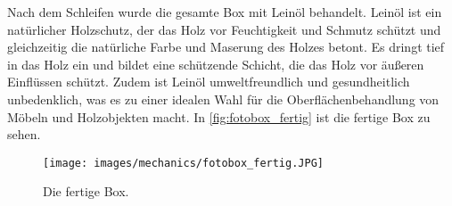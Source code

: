 Nach dem Schleifen wurde die gesamte Box mit Leinöl behandelt.
Leinöl ist ein natürlicher Holzschutz, der das Holz vor Feuchtigkeit
und Schmutz schützt und gleichzeitig die natürliche Farbe und Maserung des Holzes
betont. Es dringt tief in das Holz ein und bildet eine schützende Schicht,
die das Holz vor äußeren Einflüssen schützt. Zudem ist Leinöl umweltfreundlich
und gesundheitlich unbedenklich, was es zu einer idealen Wahl für die
Oberflächenbehandlung von Möbeln und Holzobjekten macht. In \autoref{fig:fotobox_fertig}
ist die fertige Box zu sehen.


\begin{figure}[H]
    \centering
    \texttt{[image: images/mechanics/fotobox\_fertig.JPG]}
    \caption{Die fertige Box.}
    \label{fig:fotobox_fertig}
\end{figure}
